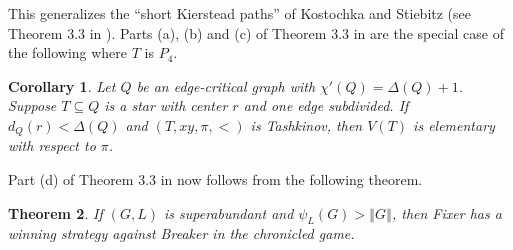 \documentclass[12pt,reqno]{amsart}
\theoremstyle{plain}
\newtheorem{thm}{Theorem}
\newtheorem{cor}[thm]{Corollary}
\theoremstyle{definition}
\theoremstyle{remark}
\newcommand{\size}[1]{\left\Vert#1\right\Vert}
\newcommand{\parens}[1]{\left( #1 \right)}
\begin{document}
This generalizes the ``short Kierstead paths'' of Kostochka and Stiebitz (see Theorem 3.3 in \cite{stiebitz2012graph}).  Parts (a), (b) and (c) of Theorem 3.3 in \cite{stiebitz2012graph} are the special case of the following where $T$ is $P_4$.

\begin{cor}
Let $Q$ be an edge-critical graph with $\chi'(Q) = \Delta(Q) + 1$.  Suppose $T \subseteq Q$ is a star with center $r$ and one edge subdivided. If $d_Q(r) < \Delta(Q)$ and $\parens{T, xy, \pi, <}$ is Tashkinov, then $V(T)$ is elementary with respect to $\pi$.
\end{cor}

Part (d) of Theorem 3.3 in \cite{stiebitz2012graph} now follows from the following theorem.

\begin{thm}\label{SubdividedStarWithExtraPsi}
If $(G,L)$ is superabundant and $\psi_L(G) > \size{G}$, then Fixer has a winning strategy against Breaker in the chronicled game.
\end{thm}
\end{document}

